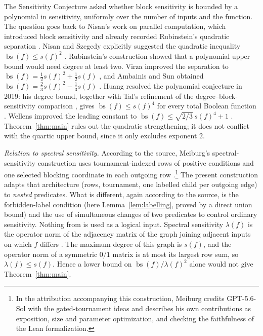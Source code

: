 \documentclass[11pt]{article}
\newcommand{\bs}{\operatorname{bs}}
\theoremstyle{definition}
\theoremstyle{remark}
\begin{document}
The Sensitivity Conjecture asked whether block sensitivity is bounded by a
polynomial in sensitivity, uniformly over the number of inputs and the
function. The question goes back to Nisan's work on parallel computation,
which introduced block sensitivity and already recorded Rubinstein's
quadratic separation \cite[Section~2]{Nisan1989}.
Nisan and Szegedy explicitly suggested the quadratic inequality
\(\bs(f)\le s(f)^2\) \cite[Section~4]{NisanSzegedy1994}.
Rubinstein's construction \cite{Rubinstein1995} showed that a polynomial
upper bound would need degree at least two. Virza improved the separation
to \(\bs(f)=\tfrac12s(f)^2+\tfrac12s(f)\) \cite{Virza2011}, and
Ambainis and Sun obtained
\(\bs(f)=\frac23s(f)^2-\frac13s(f)\) \cite[Theorem~1]{AmbainisSun2011}.
Huang resolved the polynomial conjecture in 2019: his degree bound,
together with Tal's refinement of the degree--block-sensitivity comparison
\cite{Tal2013}, gives \(\bs(f)\le s(f)^4\) for every total Boolean function
\cite[Theorem~1.5]{Huang2019}. Wellens improved the leading constant to
\(\bs(f)\le\sqrt{2/3}\,s(f)^4+1\) \cite[Corollary~4.2]{Wellens2022}.
Theorem~\ref{thm:main} rules out the quadratic strengthening; it does not
conflict with the quartic upper bound, since it only excludes exponent
\(2\).

\emph{Relation to spectral sensitivity.}
According to the source, Meiburg's spectral-sensitivity construction uses
tournament-indexed rows of positive conditions and one selected blocking
coordinate in each outgoing row
\cite[Sections~3.1 and~5.2--5.5]{Meiburg2026}.\footnote{In the
attribution accompanying this construction, Meiburg credits GPT-5.6-Sol
with the gated-tournament ideas and describes his own contributions as
exposition, size and parameter optimization, and checking the faithfulness
of the Lean formalization.}
The present construction adapts that architecture (rows, tournament, one
labelled child per outgoing edge) to \emph{nested} predicates. What is
different, again according to the source, is the forbidden-label condition
(here Lemma~\ref{lem:labelling}, proved by a direct union bound) and the use
of simultaneous changes of two predicates to control ordinary sensitivity.
Nothing from \cite{Meiburg2026} is used as a logical input.
Spectral sensitivity \(\lambda(f)\) is the operator norm of the adjacency
matrix of the graph joining adjacent inputs on which \(f\) differs
\cite{AaronsonEtAl2021}. The maximum degree of this graph is \(s(f)\), and
the operator norm of a symmetric \(0/1\) matrix is at most its largest row
sum, so \(\lambda(f)\le s(f)\). Hence a lower bound on
\(\bs(f)/\lambda(f)^2\) alone would not give Theorem~\ref{thm:main}.
\end{document}
